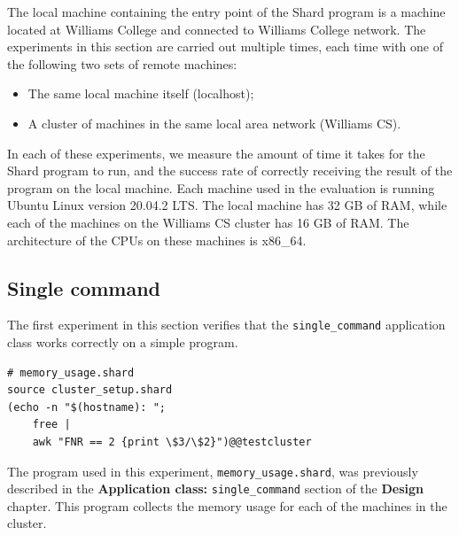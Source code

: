 \documentclass[twoside]{report}
\newcommand{\todoi}[1]{\todo[inline, color=blue!20]{TODO: {#1}}}
\begin{document}
The local machine containing the entry point of the Shard program is a machine located at Williams College and connected to Williams College network.
The experiments in this section are carried out multiple times, each time with one of the following two sets of remote machines:
\begin{itemize}
  \item The same local machine itself (localhost);
  \item A cluster of machines in the same local area network (Williams CS).
\end{itemize}
In each of these experiments, we measure the amount of time it takes for the Shard program to run, and the success rate of correctly receiving the result of the program on the local machine.
Each machine used in the evaluation is running Ubuntu Linux version 20.04.2 LTS.
The local machine has 32 GB of RAM, while each of the machines on the Williams CS cluster has 16 GB of RAM.
The architecture of the CPUs on these machines is x86\_64.


\subsection{Single command}
\begin{sloppypar}
  The first experiment in this section verifies that the \texttt{single\_command} application class works correctly on a simple program.
\end{sloppypar}

\begin{minipage}[c]{\textwidth-15pt}
  \begin{lstlisting}[language=Shard]
# memory_usage.shard
source cluster_setup.shard
(echo -n "$(hostname): ";
    free |
    awk "FNR == 2 {print \$3/\$2}")@@testcluster
\end{lstlisting}
  \smallskip
\end{minipage}

The program used in this experiment, \texttt{memory\_usage.shard}, was previously described in the \textbf{Application class: }\texttt{single\_command} section of the \textbf{Design} chapter.
This program collects the memory usage for each of the machines in the cluster.
\end{document}
